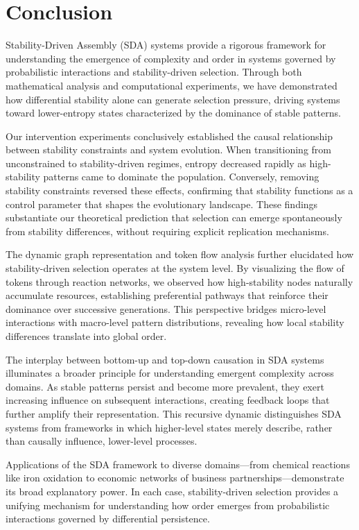 \documentclass[preprint,12pt]{elsarticle}
\begin{document}
\section{Conclusion}

Stability-Driven Assembly (SDA) systems provide a rigorous framework for understanding the emergence of complexity and order in systems governed by probabilistic interactions and stability-driven selection. Through both mathematical analysis and computational experiments, we have demonstrated how differential stability alone can generate selection pressure, driving systems toward lower-entropy states characterized by the dominance of stable patterns.

Our intervention experiments conclusively established the causal relationship between stability constraints and system evolution. When transitioning from unconstrained to stability-driven regimes, entropy decreased rapidly as high-stability patterns came to dominate the population. Conversely, removing stability constraints reversed these effects, confirming that stability functions as a control parameter that shapes the evolutionary landscape. These findings substantiate our theoretical prediction that selection can emerge spontaneously from stability differences, without requiring explicit replication mechanisms.

The dynamic graph representation and token flow analysis further elucidated how stability-driven selection operates at the system level. By visualizing the flow of tokens through reaction networks, we observed how high-stability nodes naturally accumulate resources, establishing preferential pathways that reinforce their dominance over successive generations. This perspective bridges micro-level interactions with macro-level pattern distributions, revealing how local stability differences translate into global order.

The interplay between bottom-up and top-down causation in SDA systems illuminates a broader principle for understanding emergent complexity across domains. As stable patterns persist and become more prevalent, they exert increasing influence on subsequent interactions, creating feedback loops that further amplify their representation. This recursive dynamic distinguishes SDA systems from frameworks in which higher-level states merely describe, rather than causally influence, lower-level processes.

Applications of the SDA framework to diverse domains—from chemical reactions like iron oxidation to economic networks of business partnerships—demonstrate its broad explanatory power. In each case, stability-driven selection provides a unifying mechanism for understanding how order emerges from probabilistic interactions governed by differential persistence.
\end{document}
